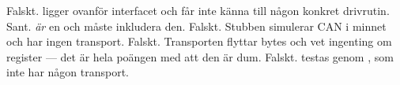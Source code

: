  Falskt.  ligger ovanför interfacet och får inte känna till någon konkret
drivrutin.
 Sant.  \emph{är} en  och måste inkludera den.
 Falskt. Stubben simulerar CAN i minnet och har ingen transport.
 Falskt. Transporten flyttar bytes och vet ingenting om register --- det är hela poängen
med att den är dum.
 Falskt.  testas genom , som inte har någon transport.
